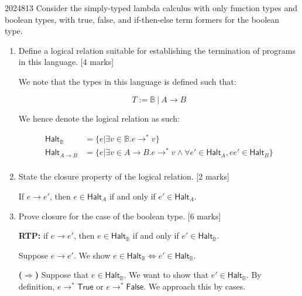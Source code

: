 \documentclass[10pt,\jkfside,a4paper]{article}
\newcommand{\answer}[1]{
    \begin{tcolorbox}[colframe=black, colback=white, sharp corners, boxrule=0.2mm, breakable]
        #1
    \end{tcolorbox}
}
\newcommand{\qmarks}[1]{\hspace*{\fill}[#1]}
\begin{document}
\begin{examquestion}{2024}{8}{13}
    Consider the simply-typed lambda calculus with only function types and boolean
    types, with true, false, and if-then-else term formers for the boolean type.

    \begin{enumerate}
        \item
            Define a logical relation suitable for establishing the termination of
            programs in this language. \qmarks{4 marks}

            \answer{ 
                We note that the types in this language is defined such that: 

                \[ 
                    T := \mathbb{B} \  |\  A \to B 
                \]

                We hence denote the logical relation as such: 

                \begin{align*} 
                    \mathsf{Halt}_{\mathbb{B}} &= \{e | \exists v \in \mathbb{B}. e \to^* v\} \\ 
                    \mathsf{Halt}_{A \to B} &= \{e | \exists v \in A \to B. e \to^* v \wedge \forall e' \in \mathsf{Halt}_A,  e e' \in \mathsf{Halt}_B\} \\ 
                \end{align*}
            }

        \item
            State the closure property of the logical relation. \qmarks{2 marks}

            \answer{ 
                If $e \to e'$, then $e \in \mathsf{Halt}_A$ if and only if $e' \in \mathsf{Halt}_A$. 
            }

        \item
            Prove closure for the case of the boolean type. \qmarks{6 marks}

            \answer{
                \textbf{RTP:} if $e \to e'$, then $e \in \mathsf{Halt}_{\mathbb{B}}$ if and only if $e' \in \mathsf{Halt}_{\mathbb{B}}$.

                Suppose $e \to e'$. We show $e \in \mathsf{Halt}_{\mathbb{B}} \Leftrightarrow e' \in \mathsf{Halt}_{\mathbb{B}}$.

                \textbf{($\Rightarrow$)} Suppose that $e \in \mathsf{Halt}_{\mathbb{B}}$. We want to show that $e' \in \mathsf{Halt}_{\mathbb{B}}$.
                By definition, $e \to^* \mathsf{True}$ or $e \to^* \mathsf{False}$. We approach this by cases.

}
\end{enumerate}
\end{examquestion}
\end{document}
